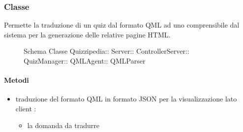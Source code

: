 \subsubsection{Classe }
Permette la traduzione di un quiz dal formato QML ad uno comprensibile dal sistema per la generazione delle relative pagine HTML.
\begin{figure}[H]
\centering
\noindent{}
\caption[Schema Classe QMLParser]{Schema Classe Quizzipedia:: Server:: ControllerServer:: QuizManager:: QMLAgent:: QMLParser}
\end{figure}
\paragraph{Metodi}
\begin{itemize}
\item {}
\newline
traduzione del formato QML in formato JSON per la visualizzazione lato client
\newline
{} :
\begin{itemize}
\item {}
\newline
la domanda da tradurre
\end{itemize}
\end{itemize}
